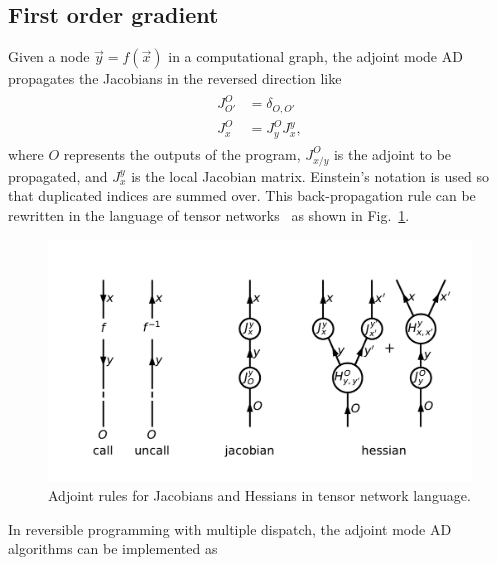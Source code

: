 \documentclass[aps,twocolumn,longbibliography,english,superscriptaddress]{revtex4-1}
\newcommand{\<}{\langle}
\renewcommand{\>}{\rangle}
\newcommand{\out}{{O}}
\newcommand{\inp}{{I}}
\newcommand{\vx}{{\vec x}}
\newcommand{\vy}{{\vec y}}
\newcommand{\Fig}[1]{Fig.~\ref{#1}}
\theoremstyle{definition}\newtheorem{definition}{\textit{Definition}}
\begin{document}
\subsection{First order gradient}\label{sec:jacobian}
Given a node $\vec y = f(\vec x)$ in a computational graph,
the adjoint mode AD propagates the Jacobians in the reversed direction like
\begin{align}
    \begin{split}
        J^{\out}_{\out'} &= \delta_{\out,\out'}\\
        J^{\out}_{x} &= J^{\out}_{y} J^{y}_{x},
    \end{split}
\end{align}
where $\out$ represents the outputs of the program, $J^{\out}_{x/y}$ is the adjoint to be propagated, and $J^{y}_x$ is the local Jacobian matrix. Einstein's notation is used so that duplicated indices are summed over.
This back-propagation rule can be rewritten in the language of tensor networks~\cite{Orus2014} as shown in \Fig{fig:ad}.
\begin{figure}
    \centerline{\includegraphics[width=0.9\columnwidth,trim={0.5cm 1cm 0 1cm},clip]{images/ad.pdf}}
    \caption{Adjoint rules for Jacobians and Hessians in tensor network language.}\label{fig:ad}
\end{figure}

In reversible programming with multiple dispatch, the adjoint mode AD algorithms can be implemented as
\end{document}
